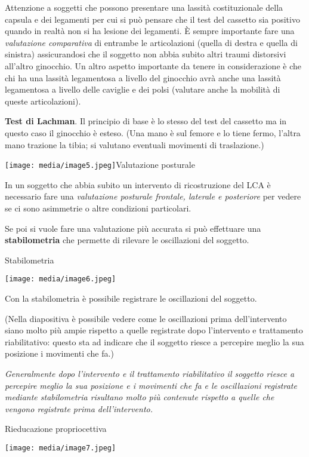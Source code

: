 \documentclass[]{article}
\begin{document}
Attenzione a soggetti che possono presentare una lassità costituzionale
della capsula e dei legamenti per cui si può pensare che il test del
cassetto sia positivo quando in realtà non si ha lesione dei legamenti.
È sempre importante fare una \emph{valutazione comparativa} di entrambe
le articolazioni (quella di destra e quella di sinistra) assicurandosi
che il soggetto non abbia subito altri traumi distorsivi all'altro
ginocchio. Un altro aspetto importante da tenere in considerazione è che
chi ha una lassità legamentosa a livello del ginocchio avrà anche una
lassità legamentosa a livello delle caviglie e dei polsi (valutare anche
la mobilità di queste articolazioni).

\textbf{Test di Lachman}. Il principio di base è lo stesso del test del
cassetto ma in questo caso il ginocchio è esteso. (Una mano è sul femore
e lo tiene fermo, l'altra mano trazione la tibia; si valutano eventuali
movimenti di traslazione.)

\texttt{[image: media/image5.jpeg]}Valutazione
posturale

In un soggetto che abbia subito un intervento di ricostruzione del LCA è
necessario fare una \emph{valutazione posturale frontale, laterale e
posteriore} per vedere se ci sono asimmetrie o altre condizioni
particolari.

Se poi si vuole fare una valutazione più accurata si può effettuare una
\textbf{stabilometria} che permette di rilevare le oscillazioni del
soggetto.

Stabilometria

\texttt{[image: media/image6.jpeg]}

Con la stabilometria è possibile registrare le oscillazioni del
soggetto.

(Nella diapositiva è possibile vedere come le oscillazioni prima
dell'intervento siano molto più ampie rispetto a quelle registrate dopo
l'intervento e trattamento riabilitativo: questo sta ad indicare che il
soggetto riesce a percepire meglio la sua posizione i movimenti che fa.)

\emph{Generalmente dopo l'intervento e il trattamento riabilitativo il
soggetto riesce a percepire meglio la sua posizione e i movimenti che fa
e le oscillazioni registrate mediante stabilometria risultano molto più
contenute rispetto a quelle che vengono registrate prima
dell'intervento. }

Rieducazione propriocettiva

\texttt{[image: media/image7.jpeg]}
\end{document}
